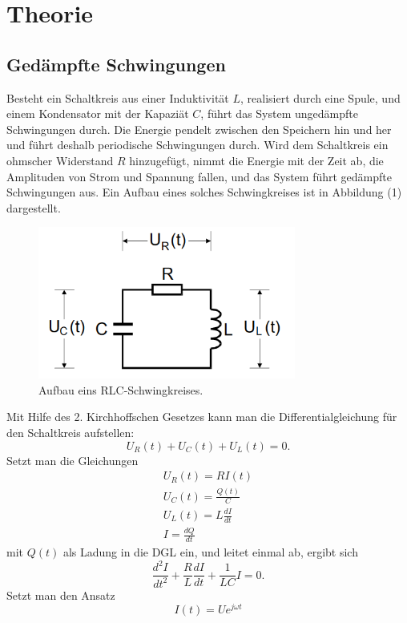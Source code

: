 \section{Theorie}
\label{sec:Theorie}

\subsection {Gedämpfte Schwingungen}
Besteht ein Schaltkreis aus einer Induktivität $L$, realisiert durch eine Spule, und einem Kondensator mit der Kapaziät $C$, führt das System
ungedämpfte Schwingungen durch. Die Energie pendelt zwischen den Speichern hin und her und führt deshalb periodische Schwingungen durch.
Wird dem Schaltkreis ein ohmscher Widerstand $R$ hinzugefügt, nimmt die Energie mit der Zeit ab, die Amplituden von Strom und Spannung fallen,
und das System führt gedämpfte Schwingungen aus. Ein Aufbau eines solches Schwingkreises ist in Abbildung (1) dargestellt. 
\begin{figure}[H]
  \centering
  \includegraphics[height=5cm]{RLC.png}
  \caption{Aufbau eins RLC-Schwingkreises. \cite[S.1]{kent}}
\end{figure}
\noindent Mit Hilfe des 2. Kirchhoffschen Gesetzes kann man die Differentialgleichung für den Schaltkreis aufstellen:
\begin{equation}
U_R (t) + U_C (t) + U_L (t) = 0 .
\end{equation}
Setzt man die Gleichungen
\begin{align}
U_R (t) = R I(t)  \\
U_C (t) = \frac{Q(t)}{C}  \\
U_L (t) = L \frac{dI}{dt} \\
I = \frac{dQ}{dt}
\end{align}
mit $Q(t)$ als Ladung in die DGL ein, und leitet einmal ab, ergibt sich 
\begin{equation}
\frac{d^2I}{dt^2} + \frac{R}{L}\frac{dI}{dt} + \frac{1}{LC}I = 0 .
\end{equation}
Setzt man den Ansatz
\begin{equation*}
I(t) = U e^{j\omega t}
\end{equation*}
